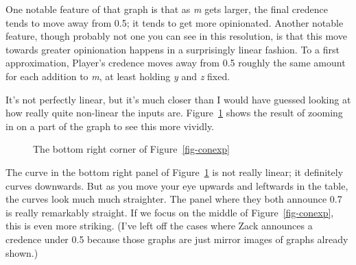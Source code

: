 \documentclass[
  10pt,
  letterpaper,
  DIV=11,
  numbers=noendperiod,
  twoside]{scrartcl}
\begin{document}
One notable feature of that graph is that as \emph{m} gets larger, the
final credence tends to move away from 0.5; it tends to get more
opinionated. Another notable feature, though probably not one you can
see in this resolution, is that this move towards greater opinionation
happens in a surprisingly linear fashion. To a first approximation,
Player's credence moves away from 0.5 roughly the same amount for each
addition to \emph{m}, at least holding \emph{y} and \emph{z} fixed.

It's not perfectly linear, but it's much closer than I would have
guessed looking at how really quite non-linear the inputs are.
Figure~\ref{fig-cap-bottom-right} shows the result of zooming in on a
part of the graph to see this more vividly.

\begin{figure}


\caption{\label{fig-cap-bottom-right}The bottom right corner of
Figure~\ref{fig-conexp}}

\end{figure}%

The curve in the bottom right panel of Figure~\ref{fig-cap-bottom-right}
is not really linear; it definitely curves downwards. But as you move
your eye upwards and leftwards in the table, the curves look much much
straighter. The panel where they both announce 0.7 is really remarkably
straight. If we focus on the middle of Figure~\ref{fig-conexp}, this is
even more striking. (I've left off the cases where Zack announces a
credence under 0.5 because those graphs are just mirror images of graphs
already shown.)
\end{document}
